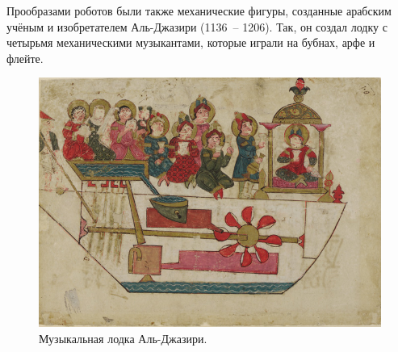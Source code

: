 Прообразами роботов были также механические фигуры, созданные арабским учёным и изобретателем Аль-Джазири (1136~-- 1206). Так, он создал лодку с четырьмя механическими музыкантами, которые играли на бубнах, арфе и флейте.
\clearpage
\begin{figure}[h!]
	\begin{center}	
		\includegraphics[width=1\linewidth]{chapters/chapter1/images/1}
		\caption{Музыкальная лодка Аль-Джазири.}
		\label{ris:image1x1}
	\end{center}
\end{figure}

